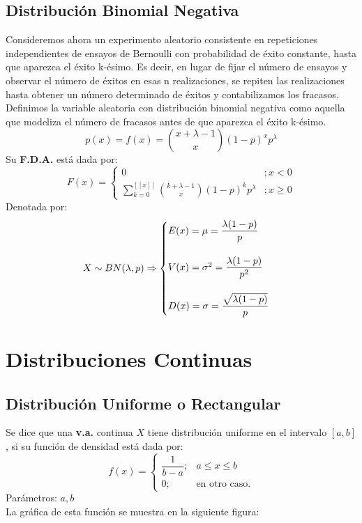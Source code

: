 \subsection{Distribución Binomial Negativa}
Consideremos ahora un experimento aleatorio consistente en repeticiones independientes de
ensayos de Bernoulli con probabilidad de éxito constante, hasta que aparezca el éxito k-ésimo.
Es decir, en lugar de fijar el número de ensayos y observar el número de éxitos en esas n
realizaciones, se repiten las realizaciones hasta obtener un número determinado de éxitos y contabilizamos los fracasos. Definimos la variable aleatoria con
distribución binomial negativa
como aquella que modeliza el número de fracasos antes de que aparezca el éxito k-ésimo.
$$
p(x)=f(x)=\binom{x+\lambda-1}{x} (1-p)^x p^\lambda
$$
Su \textbf{F.D.A.} está dada por:
$$
F(x)=
\begin{cases}
0 &; x<0 \\
\displaystyle\sum_{k=0}^{[\![ x ]\!]} \binom{k+\lambda-1}{x} (1-p)^k p^\lambda &; x\geq 0
\end{cases}
$$
Denotada por:
$$
X\sim BN(\lambda,p)\Rightarrow
\begin{cases}
E(x)=\mu= \dfrac{\lambda(1-p)}{p} \\ \vspace{0.01cm} \\
V(x)=\sigma^2 = \dfrac{\lambda (1-p)}{p^2}\\ \vspace{0.01cm} \\
D(x)=\sigma= \dfrac{\sqrt{\lambda (1-p)}}{p}
\end{cases}
$$
\section{Distribuciones Continuas}
\subsection{Distribución Uniforme o Rectangular}
Se dice que una \textbf{v.a.} continua $X$ tiene distribución uniforme en el intervalo $[a,b]$, si su función de densidad está dada por:
$$
f(x) = 
\begin{cases}
\dfrac{1}{b-a} ;& a\leq x \leq b \\
0 ;& \text{en otro caso.}
\end{cases}
$$
Parámetros: $a,b$ \\$ { } $\\
La gráfica de esta función se muestra en la siguiente figura:

